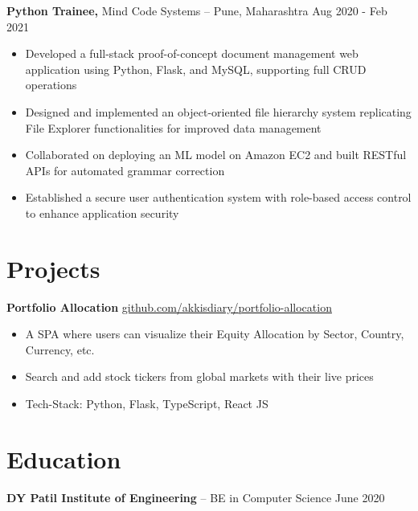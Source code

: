 \documentclass[11pt]{article}       %
\begin{document}
\textbf{Python Trainee,} {Mind Code Systems} -- Pune, Maharashtra \hfill Aug 2020 - Feb 2021 \\
\vspace{-9pt}
\begin{itemize}
  \item Developed a full-stack proof-of-concept document management web application using Python, Flask, and MySQL, supporting full CRUD operations
  \item Designed and implemented an object-oriented file hierarchy system replicating File Explorer functionalities for improved data management
  \item Collaborated on deploying an ML model on Amazon EC2 and built RESTful APIs for automated grammar correction
  \item Established a secure user authentication system with role-based access control to enhance application security
\end{itemize}

\vspace{-18.5pt}

\section*{Projects}
\textbf{Portfolio Allocation} \hfill \href{https://github.com/Akkisdiary/portfolio-allocation}{github.com/akkisdiary/portfolio-allocation} \\
\vspace{-9pt}
\begin{itemize}
  \item A SPA where users can visualize their Equity Allocation by Sector, Country, Currency, etc.
  \item Search and add stock tickers from global markets with their live prices
  \item Tech-Stack: Python, Flask, TypeScript, React JS
\end{itemize}


\vspace{-18.5pt}

\section*{Education}
\textbf{DY Patil Institute of Engineering} -- BE in Computer Science \hfill June 2020 \\
\end{document}
